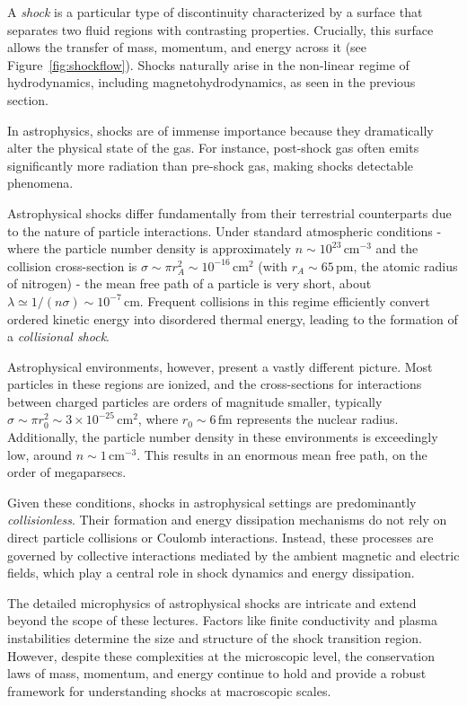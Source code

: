 A \emph{shock} is a particular type of discontinuity characterized by a surface that separates two fluid regions with contrasting properties. Crucially, this surface allows the transfer of mass, momentum, and energy across it (see Figure~\ref{fig:shockflow}). Shocks naturally arise in the non-linear regime of hydrodynamics, including magnetohydrodynamics, as seen in the previous section. 

In astrophysics, shocks are of immense importance because they dramatically alter the physical state of the gas. For instance, post-shock gas often emits significantly more radiation than pre-shock gas, making shocks detectable phenomena.

Astrophysical shocks differ fundamentally from their terrestrial counterparts due to the nature of particle interactions. Under standard atmospheric conditions - where the particle number density is approximately \( n \sim 10^{23} \, \text{cm}^{-3} \) and the collision cross-section is \( \sigma \sim \pi r_A^2 \sim 10^{-16} \, \text{cm}^2 \) (with \( r_A \sim 65 \, \text{pm} \), the atomic radius of nitrogen) - the mean free path of a particle is very short, about \( \lambda \simeq 1 / (n \sigma) \sim 10^{-7} \, \text{cm} \). Frequent collisions in this regime efficiently convert ordered kinetic energy into disordered thermal energy, leading to the formation of a \emph{collisional shock}.

Astrophysical environments, however, present a vastly different picture. Most particles in these regions are ionized, and the cross-sections for interactions between charged particles are orders of magnitude smaller, typically \( \sigma \sim \pi r_0^2 \sim 3 \times 10^{-25} \, \text{cm}^2 \), where \( r_0 \sim 6 \, \text{fm} \) represents the nuclear radius. Additionally, the particle number density in these environments is exceedingly low, around \( n \sim 1 \, \text{cm}^{-3} \). This results in an enormous mean free path, on the order of megaparsecs.

Given these conditions, shocks in astrophysical settings are predominantly \emph{collisionless}. Their formation and energy dissipation mechanisms do not rely on direct particle collisions or Coulomb interactions. Instead, these processes are governed by collective interactions mediated by the ambient magnetic and electric fields, which play a central role in shock dynamics and energy dissipation.

The detailed microphysics of astrophysical shocks are intricate and extend beyond the scope of these lectures. Factors like finite conductivity and plasma instabilities determine the size and structure of the shock transition region. However, despite these complexities at the microscopic level, the conservation laws of mass, momentum, and energy continue to hold and provide a robust framework for understanding shocks at macroscopic scales.

